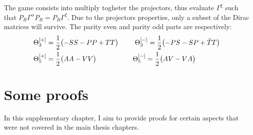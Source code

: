 \documentclass[english, LaM, oneside, noexaminfo]{sapthesis}
\begin{document}
The game consists into multiply togheter the projectors, thus evaluate $\Gamma^\xi$ such that $ P_R \Gamma^\alpha P_R = P_R\Gamma^\xi $.
Due to the projectors properties, only a subset of the Dirac matrices will survive.
The parity even and parity odd parts are respectively:
\begin{equation*}
    \begin{aligned}
        & \Theta_3^{[+]} = \frac{1}{2}\bigl(-SS-PP+TT\bigr) & \hspace*{5mm}\Theta_3^{[-]} = \frac{1}{2}\bigl(-PS-SP+\tilde{T}T\bigr) \\
        & \Theta_5^{[+]} = \frac{1}{2}\bigl(AA-VV\bigr) &  \Theta_5^{[-]} = \frac{1}{2}\bigl(AV-VA\bigr) \hspace*{1.25cm}  \\
    \end{aligned}
\end{equation*}

\chapter{Some proofs}\label{app:proofs}
\noindent
In this supplementary chapter, I aim to provide proofs for certain aspects that were not covered in the main thesis chapters.
\end{document}
